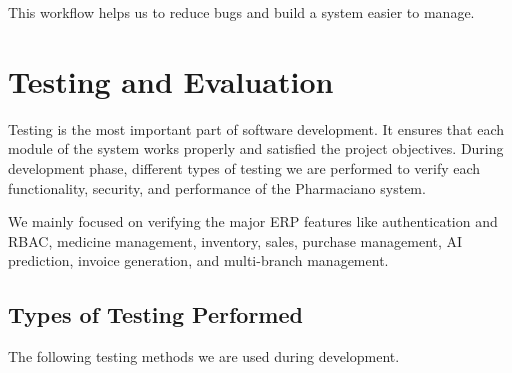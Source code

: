 This workflow helps us to reduce bugs and build a system easier to manage.

\section{Testing and Evaluation}
Testing is the most important part of software development. It ensures that each module of the system works properly and satisfied the project objectives. During development phase, different types of testing we are performed to verify each functionality, security, and performance of the Pharmaciano system.

We mainly focused on verifying the major ERP features like authentication and RBAC, medicine management, inventory, sales, purchase management, AI prediction, invoice generation, and multi-branch management.

\subsection{Types of Testing Performed}
The following testing methods we are used during development.

\small

